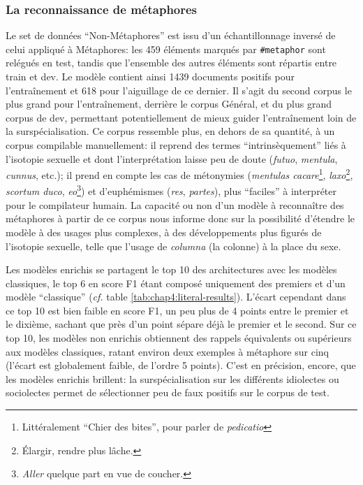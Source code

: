 
\subsubsection{La reconnaissance de métaphores}

Le set de données \enquote{Non-Métaphores} est issu d'un échantillonnage inversé de celui appliqué à Métaphores: les 459 éléments marqués par \texttt{\#metaphor} sont relégués en test, tandis que l'ensemble des autres éléments sont répartis entre train et dev. Le modèle contient ainsi 1439 documents positifs pour l'entraînement et 618 pour l'aiguillage de ce dernier. Il s'agit du second corpus le plus grand pour l'entraînement, derrière le corpus Général, et du plus grand corpus de dev, permettant potentiellement de mieux guider l'entraînement loin de la surspécialisation. Ce corpus ressemble plus, en dehors de sa quantité, à un corpus compilable manuellement: il reprend des termes \enquote{intrinsèquement} liés à l'isotopie sexuelle et dont l'interprétation laisse peu de doute (\textit{futuo}, \textit{mentula}, \textit{cunnus}, etc.); il prend en compte les cas de métonymies (\textit{mentulas cacare}\footnote{Littéralement \enquote{Chier des bites}, pour parler de \textit{pedicatio}}, \textit{laxo}\footnote{Élargir, rendre plus lâche.}, \textit{scortum duco}, \textit{eo}\footnote{\textit{Aller} quelque part en vue de coucher.}) et d'euphémismes (\textit{res}, \textit{partes}), plus \enquote{faciles} à interpréter pour le compilateur humain. La capacité ou non d'un modèle à reconnaître des métaphores à partir de ce corpus nous informe donc sur la possibilité d'étendre le modèle à des usages plus complexes, à des développements plus figurés de l'isotopie sexuelle, telle que l'usage de \textit{columna} (la colonne) à la place du sexe.


Les modèles enrichis se partagent le top 10 des architectures avec les modèles classiques, le top 6 en score F1 étant composé uniquement des premiers et d'un modèle \enquote{classique} (\textit{cf.} table \ref{tab:chap4:literal-results}). L'écart cependant dans ce top 10 est bien faible en score F1, un peu plus de 4 points entre le premier et le dixième, sachant que près d'un point sépare déjà le premier et le second. Sur ce top 10, les modèles non enrichis obtiennent des rappels équivalents ou supérieurs aux modèles classiques, ratant environ deux exemples à métaphore sur cinq (l'écart est globalement faible, de l'ordre 5 points). C'est en précision, encore, que les modèles enrichis brillent: la surspécialisation sur les différents idiolectes ou sociolectes permet de sélectionner peu de faux positifs sur le corpus de test.

